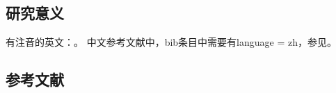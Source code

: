 
\subsection{研究意义}
\vspace{-5pt}

有注音的英文：\cite{test}。
中文参考文献中，bib条目中需要有language = {zh}，参见\cite{test2}。

\begin{REF}
\subsection*{参考文献}
\vspace{-50pt}

\end{REF}

